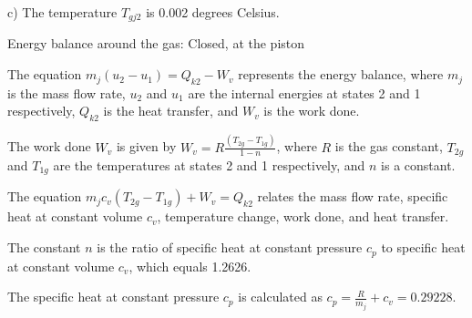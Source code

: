 c) The temperature \( T_{gj2} \) is 0.002 degrees Celsius.

Energy balance around the gas: Closed, at the piston

The equation \( m_j (u_2 - u_1) = Q_{k2} - W_v \) represents the energy balance, where \( m_j \) is the mass flow rate, \( u_2 \) and \( u_1 \) are the internal energies at states 2 and 1 respectively, \( Q_{k2} \) is the heat transfer, and \( W_v \) is the work done.

The work done \( W_v \) is given by \( W_v = R \frac{(T_{2g} - T_{1g})}{1 - n} \), where \( R \) is the gas constant, \( T_{2g} \) and \( T_{1g} \) are the temperatures at states 2 and 1 respectively, and \( n \) is a constant.

The equation \( m_j c_v (T_{2g} - T_{1g}) + W_v = Q_{k2} \) relates the mass flow rate, specific heat at constant volume \( c_v \), temperature change, work done, and heat transfer.

The constant \( n \) is the ratio of specific heat at constant pressure \( c_p \) to specific heat at constant volume \( c_v \), which equals 1.2626.

The specific heat at constant pressure \( c_p \) is calculated as \( c_p = \frac{R}{m_j} + c_v = 0.29228 \).